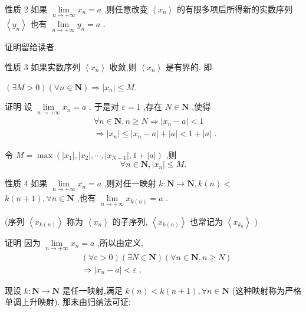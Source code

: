 性质 2 如果 $\mathop{\lim }\limits_{{n \rightarrow   + \infty }}{x}_{n} = a$ ,则任意改变 $\left\langle  {x}_{n}\right\rangle$ 的有限多项后所得新的实数序列 $\left\langle  {y}_{n}\right\rangle$ 也有 $\mathop{\lim }\limits_{{n \rightarrow   + \infty }}{y}_{n} = a$ .

证明留给读者.

性质 3 如果实数序列 $\left\langle  {x}_{n}\right\rangle$ 收敛,则 $\left\langle  {x}_{n}\right\rangle$ 是有界的. 即

$\left( {\exists M > 0}\right) \left( {\forall n \in  \mathbf{N}}\right)  \Rightarrow  \left| {x}_{n}\right|  \leq  M.$

证明 设 $\mathop{\lim }\limits_{{n \rightarrow   + \infty }}{x}_{n} = a$ . 于是对 $\varepsilon  = 1$ ,存在 $N \in  \mathbf{N}$ ,使得
\begin{align*}
	&\forall n \in  \mathbf{N},n \geq  N \Rightarrow  \left| {{x}_{n} - a}\right|  < 1\\
	&\Rightarrow  \left| {x}_{n}\right|  \leq  \left| {{x}_{n} - a}\right|  + \left| a\right|  < 1 + \left| a\right| \text{ . }
\end{align*}

令 $M = \max \left( {\left| {x}_{1}\right| ,\left| {x}_{2}\right| ,\cdots ,\left| {x}_{N - 1}\right| ,1 + \left| a\right| }\right)$ ,则
$$\forall n \in  \mathbf{N},\left| {x}_{n}\right|  \leq  M.$$

性质 4 如果 $\mathop{\lim }\limits_{{n \rightarrow   + \infty }}{x}_{n} = a$ ,则对任一映射 $k : \mathbf{N} \rightarrow  \mathbf{N},k\left( n\right)  <$  $k\left( {n + 1}\right) ,\forall n \in  \mathbf{N}$ ,也有 $\mathop{\lim }\limits_{{n \rightarrow   + \infty }}{x}_{k\left( n\right) } = a$ .

(序列 $\left\langle  {x}_{k\left( n\right) }\right\rangle$ 称为 $\left\langle  {x}_{n}\right\rangle$ 的子序列, $\left\langle  {x}_{k\left( n\right) }\right\rangle$ 也常记为 $\left\langle  {x}_{{k}_{n}}\right\rangle$ )

证明 因为 $\mathop{\lim }\limits_{{n \rightarrow   + \infty }}{x}_{n} = a$ ,所以由定义,
\begin{align*}
	&\left( {\forall \varepsilon  > 0}\right) \left( {\exists N \in  \mathbf{N}}\right) \left( {\forall n \in  \mathbf{N},n \geq  N}\right)\\
	&\Rightarrow  \left| {{x}_{n} - a}\right|  < \varepsilon \text{ . }
\end{align*}

现设 $k : \mathbf{N} \rightarrow  \mathbf{N}$ 是任一映射,满足 $k\left( n\right)  < k\left( {n + 1}\right) ,\forall n \in  \mathbf{N}$ (这种映射称为严格单调上升映射). 那末由归纳法可证:

